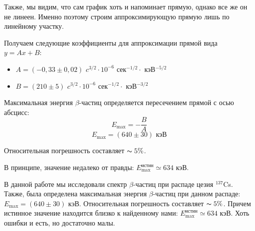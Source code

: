 \begin{enumerate}
		Также, мы видим, что сам график хоть и напоминает прямую, однако все же он не линеен. Именно поэтому строим аппроксимирующую прямую лишь по линейному участку.
		
		Получаем следующие коэффициенты для аппроксимации прямой вида $y = Ax + B$:
		\begin{itemize}
			\item $A = (-0,33 \pm 0,02)$ $c^{3/2} \cdot 10^{-6}$ сек$^{-1/2} \cdot$ кэВ$^{-5/2}$
			
			\item $B = (210 \pm 5)$ $c^{3/2} \cdot 10^{-6}$ сек$^{-1/2} \cdot$ кэВ$^{-3/2}$
		\end{itemize}
	
		Максимальная энергия $\beta$-частиц определяется пересечением прямой с осью абсцисс:
		\begin{equation*}
			E_\text{max} = -\frac{B}{A}
		\end{equation*}
		\begin{equation*}
			\boxed{E_\text{max} = (640 \pm 30) \text{ кэВ}}
		\end{equation*}
		
		Относительная погрешность составляет $\thicksim 5\%$.
		
		В принципе, значение недалеко от правды: $E_\text{max}^\text{истин} \simeq 634 \text{ кэВ}$.
	\end{enumerate}
	
	
	В данной работе мы исследовали спектр $\beta$-частиц при распаде цезия $^{137}$Cs. Также, была определена максимальная энергия $\beta$-частиц при данном распаде: $E_\text{max} = (640 \pm 30)$ кэВ. Относительная погрешность составляет $\thicksim 5\%$. Причем истинное значение находится близко к найденному нами: $E_\text{max}^\text{истин} \simeq 634$ кэВ. Хоть ошибки и есть, но достаточно малы.
	
